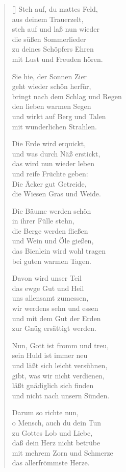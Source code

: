 \begin{multicols}{2}
\begin{verse}[\versewidth]
 Steh auf, du mattes Feld,\\
aus deinem Trauerzelt,\\
steh auf und laß nun wieder\\
die süßen Sommerlieder\\
zu deines Schöpfers Ehren\\
mit Lust und Freuden hören.

 Sie hie, der Sonnen Zier\\
geht wieder schön herfür,\\
bringt nach dem Schlag und Regen\\
den lieben warmen Segen\\
und wirkt auf Berg und Talen\\
mit wunderlichen Strahlen.

 Die Erde wird erquickt,\\
und was durch Näß erstickt,\\
das wird nun wieder leben\\
und reife Früchte geben:\\
Die Äcker gut Getreide,\\
die Wiesen Gras und Weide.

 Die Bäume werden schön\\
in ihrer Fülle stehn,\\
die Berge werden fließen\\
und Wein und Öle gießen,\\
das Bienlein wird wohl tragen\\
bei guten warmen Tagen.

 Davon wird unser Teil\\
das ewge Gut und Heil\\
uns allensamt zumessen,\\
wir werdens sehn und essen\\
und mit dem Gut der Erden\\
zur Gnüg ersättigt werden.

 Nun, Gott ist fromm und treu,\\
sein Huld ist immer neu\\
und läßt sich leicht versühnen,\\
gibt, was wir nicht verdienen,\\
läßt gnädiglich sich finden\\
und nicht nach unsern Sünden.

 Darum so richte nun,\\
o Mensch, auch du dein Tun\\
zu Gottes Lob und Liebe,\\
daß dein Herz nicht betrübe\\
mit mehrem Zorn und Schmerze\\
das allerfrömmste Herze.

\end{verse}
\end{multicols}
